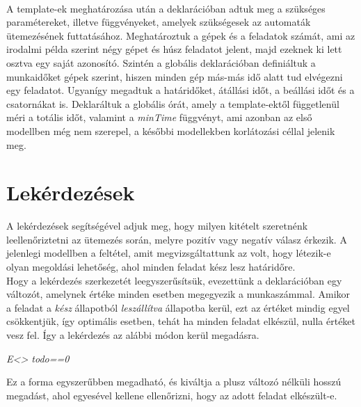 \documentclass {report}
\begin{document}
    \\    
    A template-ek meghatározása után a deklarációban adtuk meg a szükséges paramétereket, illetve függvényeket, amelyek szükségesek az automaták ütemezésének futtatásához. Meghatároztuk a gépek és a feladatok számát, ami az irodalmi példa szerint négy gépet és húsz feladatot jelent, majd ezeknek ki lett osztva egy saját azonosító. Szintén a globális deklarációban definiáltuk a munkaidőket gépek szerint, hiszen minden gép más-más idő alatt tud elvégezni egy feladatot. Ugyanígy megadtuk a határidőket, átállási időt, a beállási időt és a csatornákat is. Deklaráltuk a globális órát, amely a template-ektől függetlenül méri a totális időt, valamint a \emph{minTime} függvényt, ami azonban az első modellben még nem szerepel, a későbbi modellekben korlátozási céllal jelenik meg.
    \section{Lekérdezések}
    A lekérdezések segítségével adjuk meg, hogy milyen kitételt szeretnénk leellenőriztetni az ütemezés során, melyre pozitív vagy negatív válasz érkezik. A jelenlegi modellben a feltétel, amit megvizsgáltattunk az volt, hogy létezik-e olyan megoldási lehetőség, ahol minden feladat kész lesz határidőre.\\
    Hogy a lekérdezés szerkezetét leegyszerűsítsük, evezettünk a deklarációban egy változót, amelynek értéke minden esetben megegyezik a munkaszámmal. Amikor a feladat a \emph{kész} állapotból \emph{leszállítva} állapotba kerül, ezt az értéket mindig egyel csökkentjük, így optimális esetben, tehát ha minden feladat elkészül, nulla értéket vesz fel. Így a lekérdezés az alábbi módon kerül megadásra.
    \begin{center}
	\emph{E<> todo==0}
    \end{center}
    Ez a forma egyszerűbben megadható, és kiváltja a plusz változó nélküli hosszú megadást, ahol egyesével kellene ellenőrizni, hogy az adott feladat elkészült-e.
    
\end{document}
